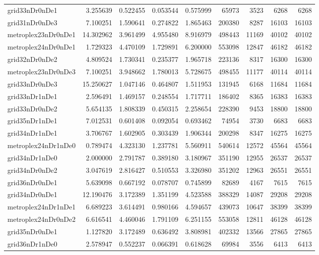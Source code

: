 \documentclass[../../../thesis.tex]{subfiles}
\begin{document}
\begin{longtable}{|l|r|r|r|r|r|r|r|r|}
grid33nDr0nDe1 & 3.255639 & 0.522455 & 0.053544 & 0.575999 & 65973 & 3523 & 6268 & 6268 \\
grid31nDr0nDe3 & 7.100251 & 1.590641 & 0.274822 & 1.865463 & 200380 & 8287 & 16103 & 16103 \\
metroplex23nDr0nDe1 & 14.302962 & 3.961499 & 4.955480 & 8.916979 & 498443 & 11169 & 40102 & 40102 \\
metroplex24nDr0nDe1 & 1.729323 & 4.470109 & 1.729891 & 6.200000 & 553098 & 12847 & 46182 & 46182 \\
grid32nDr0nDe2 & 4.809524 & 1.730341 & 0.235377 & 1.965718 & 223136 & 8317 & 16300 & 16300 \\
metroplex23nDr0nDe3 & 7.100251 & 3.948662 & 1.780013 & 5.728675 & 498455 & 11177 & 40114 & 40114 \\
grid33nDr0nDe3 & 15.250627 & 1.047146 & 0.464807 & 1.511953 & 131945 & 6168 & 11684 & 11684 \\
grid33nDr1nDe1 & 2.596491 & 1.469157 & 0.248554 & 1.717711 & 186402 & 8365 & 16383 & 16383 \\
grid33nDr0nDe2 & 5.654135 & 1.808339 & 0.450315 & 2.258654 & 228390 & 9453 & 18800 & 18800 \\
grid35nDr1nDe1 & 7.012531 & 0.601408 & 0.092054 & 0.693462 & 74954 & 3730 & 6683 & 6683 \\
grid34nDr1nDe1 & 3.706767 & 1.602905 & 0.303439 & 1.906344 & 200298 & 8347 & 16275 & 16275 \\
metroplex24nDr1nDe0 & 0.789474 & 4.323130 & 1.237781 & 5.560911 & 540614 & 12572 & 45564 & 45564 \\
grid34nDr1nDe0 & 2.000000 & 2.791787 & 0.389180 & 3.180967 & 351190 & 12955 & 26537 & 26537 \\
grid34nDr0nDe2 & 3.047619 & 2.816427 & 0.510553 & 3.326980 & 351202 & 12963 & 26551 & 26551 \\
grid36nDr0nDe1 & 5.639098 & 0.667192 & 0.078707 & 0.745899 & 82689 & 4167 & 7615 & 7615 \\
grid34nDr0nDe1 & 12.190476 & 3.172389 & 1.351199 & 4.523588 & 388329 & 14087 & 29208 & 29208 \\
metroplex24nDr1nDe1 & 6.689223 & 3.614491 & 0.980166 & 4.594657 & 439073 & 10647 & 38399 & 38399 \\
metroplex24nDr0nDe2 & 6.616541 & 4.460046 & 1.791109 & 6.251155 & 553058 & 12811 & 46128 & 46128 \\
grid35nDr0nDe1 & 1.127820 & 3.172489 & 0.636492 & 3.808981 & 402332 & 13566 & 27865 & 27865 \\
grid36nDr1nDe0 & 2.578947 & 0.552237 & 0.066391 & 0.618628 & 69984 & 3556 & 6413 & 6413 \\

\end{longtable}
\end{document}
